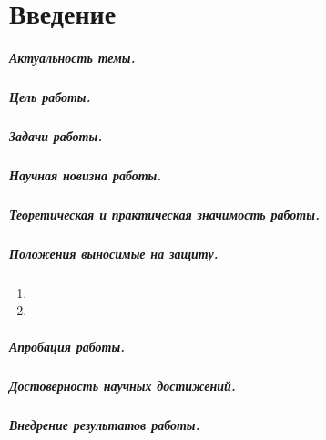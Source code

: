 \chapter*{Введение}                         %

\paragraph*{Актуальность темы.}

\paragraph*{Цель работы.}

\paragraph*{Задачи работы.}

\paragraph*{Научная новизна работы.}

\paragraph*{Теоретическая и практическая значимость работы.}

\paragraph*{Положения выносимые на защиту.}
\begin{enumerate}
    \item \statementOneRU
    \item \statementTwoRU 
\end{enumerate}

\paragraph*{Апробация работы.}

\paragraph*{Достоверность научных достижений.}

\paragraph*{Внедрение результатов работы.}

